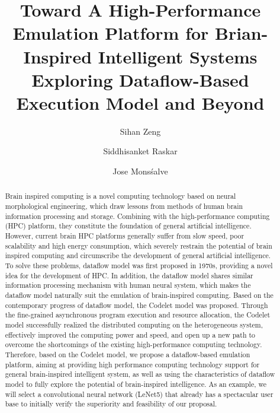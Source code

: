 \documentclass[runningheads]{llncs}
\begin{document}
%
\title{Toward A High-Performance Emulation Platform for Brian-Inspired Intelligent Systems \\ Exploring Dataflow-Based Execution Model and Beyond}
%
%
%
\author{Sihan Zeng 
\and Siddhisanket Raskar
\and Jose Monsśalve }


%
%

\maketitle              %
%
\begin{abstract}
Brain inspired computing is a novel computing technology based on neural morphological engineering, which draw lessons from methods of human brain information processing and storage. Combining with the high-performance computing (HPC) platform, they constitute the foundation of general artificial intelligence. However, current brain HPC platforms generally suffer from slow speed, poor scalability and high energy consumption, which severely restrain the potential of brain inspired computing and circumscribe the development of general artificial intelligence. To solve these problems, dataflow model was first proposed in 1970s, providing a novel idea for the development of HPC. In addition, the dataflow model shares similar information processing mechanism with human neural system, which makes the dataflow model naturally suit the emulation of brain-inspired computing. Based on the contemporary progress of dataflow model, the Codelet model was proposed. Through the fine-grained asynchronous program execution and resource allocation, the Codelet model successfully realized the distributed computing on the heterogeneous system, effectively improved the computing power and speed, and open up a new path to overcome the shortcomings of the existing high-performance computing technology.
Therefore, based on the Codelet model, we propose a dataflow-based emulation platform, aiming at providing high performance computing technology support for general brain-inspired intelligent system, as well as using the characteristics of dataflow model to fully explore the potential of brain-inspired intelligence. As an example, we will select a convolutional neural network (LeNet5) that already has a spectacular user base to initially verify the superiority and feasibility of our proposal.


\end{abstract}
\end{document}
